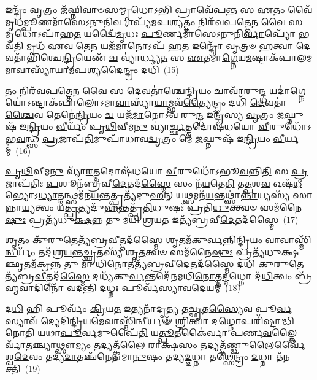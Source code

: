 {\anuvakamend[{\-\ul{𑌅}\-\-\ul{𑌸𑍍𑌯} 𑌮𑌾 𑌵𑍇𑌦𑌾 𑌦𑍍𑌯𑌾𑌵𑌾᳴𑌪𑍃\-\ul{𑌥𑌿}\-𑌵𑍍𑌯𑍋𑌰᳴𑌬𑍍𑌰\-\ul{𑌵𑍀}\-𑌦𑌿\-\ul{𑌤𑌿} 𑌤𑌸𑍍𑌮𑌾॑\-\ul{𑌚𑍍𑌚}\-𑌤𑍍𑌵𑌾𑌰𑌿᳴ 𑌚}]}%

𑌇𑌨𑍍𑌦𑍍𑌰𑌂᳴ \ul{𑌵𑍃}\-𑌤𑍍𑌰𑌂 𑌜᳴\-\ul{𑌘𑍍𑌨𑌿}\-𑌵𑌾𑍞\-\ul{𑌸}\-𑌮𑍍𑌮𑍃\-\ul{𑌧𑍋}\-\-𑌽𑌭𑌿 𑌪𑍍𑌰𑌾𑌵𑍇᳴𑌪\-\ul{𑌨𑍍𑌤} 𑌸 \ul{𑌏}\-𑌤𑌂 𑌵𑍈᳴\-\ul{𑌮𑍃}\-𑌧\-\ul{𑌮𑍍𑌪𑍂}\-𑌣𑌮𑌾᳴𑌸𑍇\-𑌽𑌨𑍁𑌨𑌿\-\ul{𑌰𑍍𑌵𑌾}\-𑌪𑍍𑌯᳴𑌮𑌪\-\ul{𑌶𑍍𑌯}\-𑌤𑍍𑌤𑌂 𑌨𑌿𑌰᳴𑌵\-\ul{𑌪}\-𑌤𑍍𑌤𑍇\-\ul{𑌨} 𑌵𑍈 𑌸 𑌮𑍃𑌧𑍋\-𑌽𑌪𑌾᳴𑌹\-\ul{𑌤} 𑌯𑌦𑍍𑌵𑍈᳴\-\ul{𑌮𑍃}\-𑌧𑌃 \ul{𑌪𑍂}\-𑌰𑍍𑌣𑌮𑌾᳴𑌸𑍇\-𑌽𑌨𑍁𑌨𑌿\-\ul{𑌰𑍍𑌵𑌾}\-𑌪𑍍𑌯𑍋᳴ 𑌭𑌵᳴\-\ul{𑌤𑌿} 𑌮𑍃𑌧᳴ \ul{𑌏}\-𑌵 𑌤𑍇\-\ul{𑌨} 𑌯𑌜᳴\-\ul{𑌮𑌾}\-𑌨𑍋\-𑌽𑌪᳴ 𑌹\-\ul{𑌤} 𑌇𑌨𑍍𑌦𑍍𑌰𑍋᳴ \ul{𑌵𑍃}\-𑌤𑍍𑌰𑍞 \ul{𑌹}\-𑌤𑍍𑌵𑌾 \ul{𑌦𑍇}\-𑌵𑌤𑌾᳴𑌭𑌿𑌶𑍍𑌚𑍇\-\ul{𑌨𑍍𑌦𑍍𑌰𑌿}\-𑌯𑍇𑌣᳴ \ul{𑌚} 𑌵𑍍𑌯𑌾॑𑌰𑍍𑌧𑍍𑌯\-\ul{𑌤} 𑌸 \ul{𑌏}\-𑌤𑌮𑌾॑\-\ul{𑌗𑍍𑌨𑍇}\-𑌯\-\ul{𑌮}\-𑌷𑍍𑌟𑌾𑌕᳴𑌪𑌾𑌲𑌮𑌮𑌾\-\ul{𑌵𑌾}\-𑌸𑍍𑌯𑌾᳴𑌯𑌾𑌮𑌪𑌶𑍍𑌯\-\ul{𑌦𑍈}\-𑌨𑍍𑌦𑍍𑌰𑌂 𑌦𑌧𑌿᳴~(15)

𑌤𑌂 𑌨𑌿𑌰᳴𑌵\-\ul{𑌪}\-𑌤𑍍𑌤𑍇\-\ul{𑌨} 𑌵𑍈 𑌸 \ul{𑌦𑍇}\-𑌵𑌤𑌾॑𑌶𑍍𑌚𑍇\-\ul{𑌨𑍍𑌦𑍍𑌰𑌿}\-𑌯𑌂 𑌚𑌾𑌵𑌾᳴𑌰𑍁\-\ul{𑌨𑍍𑌦𑍍𑌧} 𑌯𑌦𑌾॑\-\ul{𑌗𑍍𑌨𑍇}\-𑌯𑍋॑\-𑌽𑌷𑍍𑌟𑌾𑌕᳴𑌪𑌾𑌲𑍋\-𑌽𑌮𑌾\-\ul{𑌵𑌾}\-𑌸𑍍𑌯𑌾᳴\-\ul{𑌯𑌾}\-𑌮𑍍𑌭𑌵᳴\-\ul{𑌤𑍍𑌯𑍈}\-𑌨𑍍𑌦𑍍𑌰𑌂 𑌦𑌧𑌿᳴ \ul{𑌦𑍇}\-𑌵𑌤𑌾॑\-\ul{𑌶𑍍𑌚𑍈}\-𑌵 𑌤𑍇𑌨𑍇॑\-\ul{𑌨𑍍𑌦𑍍𑌰𑌿}\-𑌯𑌂 \ul{𑌚} 𑌯𑌜᳴\-\ul{𑌮𑌾}\-𑌨𑍋\-𑌽𑌵᳴ 𑌰𑍁\-\ul{𑌨𑍍𑌦𑍍𑌧} 𑌇𑌨𑍍𑌦𑍍𑌰᳴𑌸𑍍𑌯 \ul{𑌵𑍃}\-𑌤𑍍𑌰𑌂 \ul{𑌜}\-𑌘𑍍𑌨𑍁𑌷᳴ 𑌇\-\ul{𑌨𑍍𑌦𑍍𑌰𑌿}\-𑌯𑌂 \ul{𑌵𑍀}\-𑌰𑍍𑌯𑌂᳴ 𑌪𑍃\-\ul{𑌥𑌿}\-𑌵𑍀𑌮\-\ul{𑌨𑍁} 𑌵𑍍𑌯𑌾॑\-\ul{𑌰𑍍𑌚𑍍𑌛}\-𑌤𑍍𑌤𑌦𑍋𑌷᳴𑌧𑌯𑍋 \ul{𑌵𑍀}\-𑌰𑍁𑌧𑍋᳴\-𑌽𑌭\-\ul{𑌵}\-𑌨𑍍𑌥𑍍𑌸 \ul{𑌪𑍍𑌰}\-𑌜𑌾𑌪᳴\-\ul{𑌤𑌿}\-𑌮𑍁𑌪𑌾᳴𑌧𑌾𑌵\-\ul{𑌦𑍍𑌵𑍃}\-𑌤𑍍𑌰𑌂 𑌮𑍇᳴ \ul{𑌜}\-𑌘𑍍𑌨𑍁𑌷᳴ 𑌇\-\ul{𑌨𑍍𑌦𑍍𑌰𑌿}\-𑌯𑌂 \ul{𑌵𑍀}\-𑌰𑍍𑌯𑌮𑍍॑~(16)

\-\ul{𑌪𑍃}\-\-\ul{𑌥𑌿}\-𑌵𑍀𑌮\-\ul{𑌨𑍁} 𑌵𑍍𑌯𑌾᳴\-\ul{𑌰}\-𑌤𑍍𑌤𑌦𑍋𑌷᳴𑌧𑌯𑍋 \ul{𑌵𑍀}\-𑌰𑍁𑌧𑍋᳴\-𑌽𑌭𑍂\-\ul{𑌵}\-𑌨𑍍𑌨𑌿\-\ul{𑌤𑌿} 𑌸 \ul{𑌪𑍍𑌰}\-𑌜𑌾𑌪᳴𑌤𑌿𑌃 \ul{𑌪}\-𑌶𑍂𑌨᳴𑌬𑍍𑌰𑌵𑍀\-\ul{𑌦𑍇}\-𑌤𑌦᳴\-\ul{𑌸𑍍𑌮𑍈} 𑌸𑌂 𑌨᳴\-\ul{𑌯}\-𑌤𑍇\-\ul{𑌤𑌿} 𑌤\-\ul{𑌤𑍍𑌪}\-𑌶\-\ul{𑌵} 𑌓𑌷᳴\-\ul{𑌧𑍀}\-𑌭𑍍𑌯𑍋\-𑌽\-\ul{𑌧𑍍𑌯𑌾}\-𑌤𑍍𑌮𑌨𑍍𑌥𑍍𑌸𑌮᳴𑌨\-\ul{𑌯}\-𑌨𑍍𑌤𑌤𑍍𑌪𑍍𑌰𑌤𑍍𑌯᳴𑌦𑍁\-\ul{𑌹}\-𑌨𑍍 𑌯\-\ul{𑌥𑍍𑌸}\-𑌮𑌨᳴\-\ul{𑌯}\-𑌨𑍍𑌤𑌥𑍍𑌸𑌾॑\-\ul{𑌨𑍍𑌨𑌾}\-𑌯𑍍𑌯𑌸𑍍𑌯᳴ 𑌸𑌾𑌨𑍍𑌨𑌾\-\ul{𑌯𑍍𑌯}\-𑌤𑍍𑌵𑌂 𑌯\-\ul{𑌤𑍍𑌪𑍍𑌰}\-𑌤𑍍𑌯𑌦𑍁᳴\-\ul{𑌹}\-𑌨𑍍𑌤𑌤𑍍𑌪𑍍𑌰᳴\-\ul{𑌤𑌿}\-𑌧𑍁𑌷𑌃᳴ 𑌪𑍍𑌰𑌤𑌿\-\ul{𑌧𑍁}\-𑌕𑍍𑌤𑍍𑌵𑍞 𑌸𑌮᳴𑌨𑍈\-\ul{𑌷𑍁𑌃} 𑌪𑍍𑌰𑌤𑍍𑌯᳴𑌧𑍁\-\ul{𑌕𑍍𑌷}\-𑌨𑍍𑌨 𑌤𑍁 𑌮𑌯𑌿᳴ 𑌶𑍍𑌰𑌯\-\ul{𑌤} 𑌇𑌤𑍍𑌯᳴𑌬𑍍𑌰𑌵𑍀\-\ul{𑌦𑍇}\-𑌤𑌦᳴𑌸𑍍𑌮𑍈~(17)

\-\ul{𑌶𑍃}\-𑌤𑌂 𑌕𑍁᳴\-\ul{𑌰𑍁}\-𑌤𑍇𑌤𑍍𑌯᳴𑌬𑍍𑌰\-\ul{𑌵𑍀}\-𑌤𑍍𑌤𑌦᳴𑌸𑍍𑌮𑍈 \ul{𑌶𑍃}\-𑌤𑌮᳴𑌕𑍁𑌰𑍍𑌵𑌨𑍍𑌨𑌿\-\ul{𑌨𑍍𑌦𑍍𑌰𑌿}\-𑌯𑌂 𑌵𑌾𑌵𑌾𑌸𑍍𑌮𑌿᳴\-\ul{𑌨𑍍𑌵𑍀}\-𑌰𑍍𑌯𑌂᳴ 𑌤𑌦᳴𑌶𑍍𑌰\-\ul{𑌯}\-𑌨𑍍𑌤\-\ul{𑌚𑍍𑌛𑍃}\-𑌤𑌸𑍍𑌯᳴ 𑌶𑍃\-\ul{𑌤}\-𑌤𑍍𑌵𑍞 𑌸𑌮᳴𑌨𑍈\-\ul{𑌷𑍁𑌃} 𑌪𑍍𑌰𑌤𑍍𑌯᳴𑌧𑍁𑌕𑍍𑌷\-\ul{𑌞𑍍𑌛𑍃}\-𑌤𑌮᳴\-\ul{𑌕𑍍𑌰}\-𑌨𑍍𑌨 𑌤𑍁 𑌮𑌾᳴ 𑌧𑌿\-\ul{𑌨𑍋}\-𑌤𑍀𑌤𑍍𑌯᳴𑌬𑍍𑌰𑌵𑍀\-\ul{𑌦𑍇}\-𑌤𑌦᳴\-\ul{𑌸𑍍𑌮𑍈} 𑌦𑌧𑌿᳴ 𑌕𑍁\-\ul{𑌰𑍁}\-𑌤𑍇𑌤𑍍𑌯᳴𑌬𑍍𑌰\-\ul{𑌵𑍀}\-𑌤𑍍𑌤𑌦᳴\-\ul{𑌸𑍍𑌮𑍈} 𑌦𑌧𑍍𑌯᳴𑌕𑍁\-\ul{𑌰𑍍𑌵}\-𑌨𑍍𑌤𑌦𑍇᳴𑌨𑌮𑌧𑌿\-\ul{𑌨𑍋}\-𑌤𑍍𑌤\-\ul{𑌦𑍍𑌦}\-𑌧𑍍𑌨𑍋 𑌦᳴\-\ul{𑌧𑌿}\-𑌤𑍍𑌵𑌂 𑌬𑍍𑌰᳴𑌹𑍍𑌮\-\ul{𑌵𑌾}\-𑌦𑌿𑌨𑍋᳴ 𑌵𑌦𑌨𑍍𑌤𑌿 \ul{𑌦}\-𑌧𑍍𑌨𑌃 𑌪𑍂𑌰𑍍𑌵᳴𑌸𑍍𑌯𑌾\-\ul{𑌵}\-𑌦𑍇𑌯𑌮𑍍॑~(18)

𑌦\-\ul{𑌧𑌿} 𑌹𑌿 𑌪𑍂𑌰𑍍𑌵𑌂᳴ \ul{𑌕𑍍𑌰𑌿}\-𑌯\-\ul{𑌤} 𑌇𑌤𑍍𑌯𑌨𑌾᳴𑌦𑍃\-\ul{𑌤𑍍𑌯} 𑌤\-\ul{𑌚𑍍𑌛𑍃}\-𑌤\-\ul{𑌸𑍍𑌯𑍈}\-𑌵 𑌪𑍂\-\ul{𑌰𑍍𑌵}\-𑌸𑍍𑌯𑌾𑌵᳴ 𑌦𑍍𑌯𑍇𑌦𑌿\-\ul{𑌨𑍍𑌦𑍍𑌰𑌿}\-𑌯\-\ul{𑌮𑍇}\-𑌵𑌾𑌸𑍍𑌮𑌿᳴\-\ul{𑌨𑍍𑌵𑍀}\-𑌰𑍍𑌯𑍟᳴ \ul{𑌶𑍍𑌰𑌿}\-𑌤𑍍𑌵𑌾 \ul{𑌦}\-𑌧𑍍𑌨𑍋𑌪𑌰𑌿᳴𑌷𑍍𑌟𑌾𑌦𑍍𑌧𑌿𑌨𑍋𑌤𑌿 𑌯𑌥𑌾\-\ul{𑌪𑍂}\-𑌰𑍍𑌵𑌮𑍁𑌪𑍈᳴\-\ul{𑌤𑌿} 𑌯\-\ul{𑌤𑍍𑌪𑍂}\-𑌤𑍀𑌕𑍈॑𑌰𑍍𑌵𑌾 𑌪𑌰𑍍𑌣\-\ul{𑌵}\-𑌲𑍍𑌕𑍈𑌰𑍍𑌵𑌾᳴\-\ul{𑌤}\-𑌞𑍍𑌚𑍍𑌯𑌾\-\ul{𑌥𑍍𑌸𑍗}\-𑌮𑍍𑌯𑌂 𑌤𑌦𑍍𑌯𑌤𑍍𑌕𑍍𑌵᳴𑌲𑍈 𑌰𑌾\-\ul{𑌕𑍍𑌷}\-𑌸𑌂 𑌤𑌦𑍍𑌯𑌤𑍍𑌤᳴\-\ul{𑌣𑍍𑌡𑍁}\-𑌲𑍈𑌰𑍍𑌵𑍈॑𑌶𑍍𑌵\-\ul{𑌦𑍇}\-𑌵𑌂 𑌤𑌦𑍍𑌯\-\ul{𑌦𑌾}\-𑌤𑌞𑍍𑌚᳴𑌨𑍇𑌨 𑌮𑌾\-\ul{𑌨𑍁}\-𑌷𑌂 𑌤𑌦𑍍𑌯\-\ul{𑌦𑍍𑌦}\-𑌧𑍍𑌨𑌾 𑌤𑌥𑍍𑌸𑍇𑌨𑍍𑌦𑍍𑌰𑌂᳴ \ul{𑌦}\-𑌧𑍍𑌨𑌾 𑌤᳴𑌨𑌕𑍍𑌤𑌿~(19)

